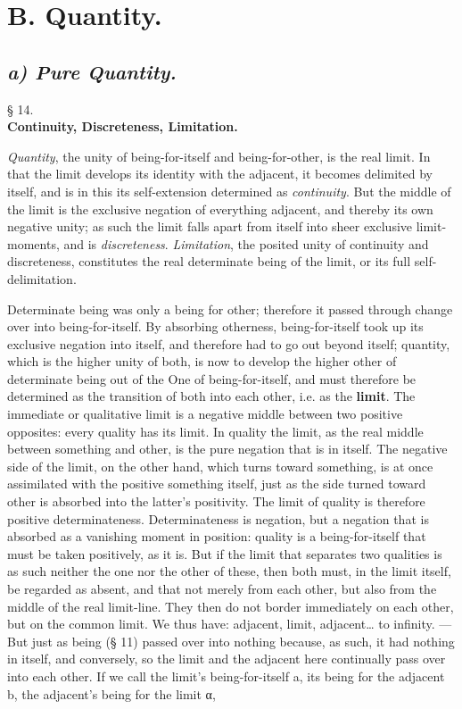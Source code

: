 \documentclass[12pt,a4paper,openany]{book}
\newcommand{\opage}[1]{\marginnote{\footnotesize\textit{[#1]}}}
\newcommand{\afsnit}[1]{\section*{\centering\textbf{#1}}\addcontentsline{toc}{section}{#1}}
\newcommand{\underafsnit}[1]{\subsection*{\centering\emph{#1}}\addcontentsline{toc}{subsection}{#1}}
\newcommand{\paragraf}[2]{\begin{center}§ #1.\\[0.2em]\textbf{#2}\end{center}}
\begin{document}
\afsnit{B. Quantity.}
\underafsnit{a) Pure Quantity.}
\paragraf{14}{Continuity, Discreteness, Limitation.}

\emph{Quantity}, the unity of being-for-itself
and being-for-other, is the real limit.
In that the limit develops its identity with the adjacent,
it becomes delimited by itself, and is
in this its self-extension determined as \emph{continuity}. But the middle of the limit is the exclusive negation
of everything adjacent, and thereby its own negative
unity; as such the limit falls apart from itself into
sheer exclusive limit-moments, and is \emph{discreteness}. \emph{Limitation}, the posited unity of continuity and
\setcounter{footnote}{0}%
\opage{26}discreteness, constitutes the real
determinate being of the limit, or its full self-delimitation.

Determinate being was only a being for other; therefore
it passed through change over into being-for-itself. By absorbing otherness, being-for-itself took up
its exclusive negation into itself, and therefore had to go out
beyond itself; quantity, which is the higher unity of both,
is now to develop the higher other of determinate being out of the One of being-for-itself,
and must therefore be determined as the
transition of both into each other, i.e. as the \textbf{limit}. The
immediate or qualitative limit is a negative
middle between two positive opposites: every
quality has its limit. In quality the limit,
as the real middle between something and other, is the pure negation that is in itself. The negative
side of the limit, on the other hand, which turns toward something,
is at once assimilated with the positive something itself,
just as the side turned toward other is absorbed into
the latter's positivity. The limit of quality is therefore positive
determinateness. Determinateness is negation, but a
negation that is absorbed as a vanishing moment in position:
quality is a being-for-itself that must be taken positively, as it is. But if the limit that separates
two qualities is as such neither the one
nor the other of these, then both must, in the limit itself,
be regarded as absent, and that not merely from each other,
but also from the middle of the real limit-line. They then do not border immediately on
each other, but on the common limit. We thus have:
adjacent, limit, adjacent\dots{} to
infinity. --- But just as being (§ 11) passed over into nothing because, as such, it had nothing in itself, and conversely,
so the limit and the adjacent
\setcounter{footnote}{0}%
\opage{27}here continually pass over into each other. If we call the limit's being-for-itself a, its being for the adjacent b, the adjacent's being for the limit α,
\end{document}
